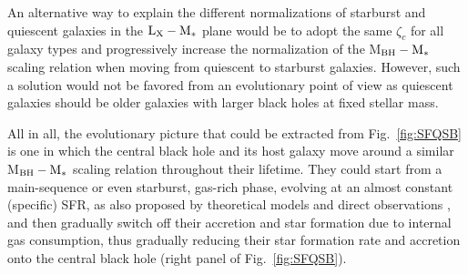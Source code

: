 
An alternative way to explain the different normalizations of starburst and quiescent galaxies in the ${\rm L}_{\rm X}-{\rm M}_*$ plane would be to adopt the same $\zeta_c$ for all galaxy types and progressively increase the normalization of the M$_{\rm BH}-{\rm M}_*$ scaling relation when moving from quiescent to starburst galaxies. %
However, such a solution would not be favored from an evolutionary point of view as quiescent galaxies should be older galaxies with larger black holes at fixed stellar mass.

All in all, the evolutionary picture that could be extracted from Fig.~\ref{fig:SFQSB} is one in which the central black hole and its host galaxy move around a similar M$_{\rm BH}-{\rm M}_*$ scaling relation throughout their lifetime. They could start from a main-sequence or even starburst, gas-rich phase, evolving at an almost constant (specific) SFR, as also proposed by theoretical models \citep[e.g.][]{2014ApJ...782...69L, Aversa15} and direct observations \citep{2020A&A...642A..65C}, and then gradually switch off their accretion and star formation due to internal gas consumption, thus gradually reducing their star formation rate and accretion onto the central black hole (right panel of Fig.~\ref{fig:SFQSB}).  


